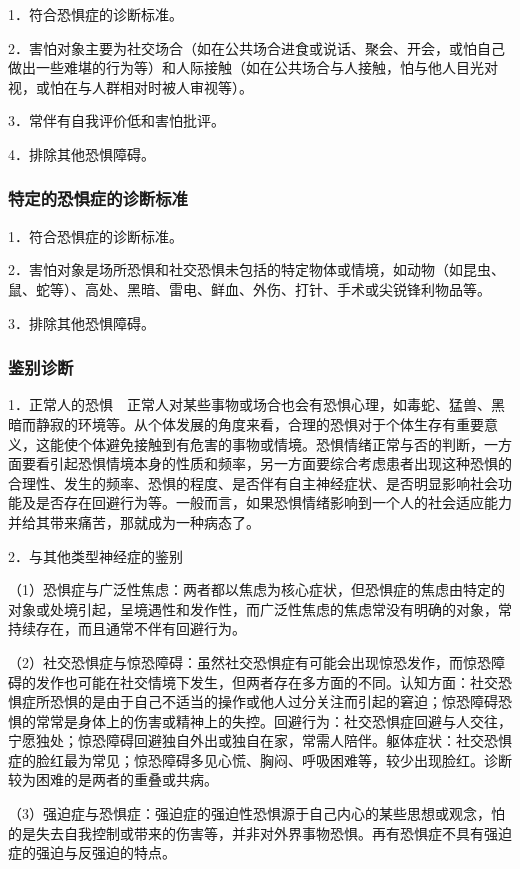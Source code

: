 1．符合恐惧症的诊断标准。

2．害怕对象主要为社交场合（如在公共场合进食或说话、聚会、开会，或怕自己做出一些难堪的行为等）和人际接触（如在公共场合与人接触，怕与他人目光对视，或怕在与人群相对时被人审视等）。

3．常伴有自我评价低和害怕批评。

4．排除其他恐惧障碍。

\subsubsection{特定的恐惧症的诊断标准}

1．符合恐惧症的诊断标准。

2．害怕对象是场所恐惧和社交恐惧未包括的特定物体或情境，如动物（如昆虫、鼠、蛇等）、高处、黑暗、雷电、鲜血、外伤、打针、手术或尖锐锋利物品等。

3．排除其他恐惧障碍。

\subsubsection{鉴别诊断}

1．正常人的恐惧　正常人对某些事物或场合也会有恐惧心理，如毒蛇、猛兽、黑暗而静寂的环境等。从个体发展的角度来看，合理的恐惧对于个体生存有重要意义，这能使个体避免接触到有危害的事物或情境。恐惧情绪正常与否的判断，一方面要看引起恐惧情境本身的性质和频率，另一方面要综合考虑患者出现这种恐惧的合理性、发生的频率、恐惧的程度、是否伴有自主神经症状、是否明显影响社会功能及是否存在回避行为等。一般而言，如果恐惧情绪影响到一个人的社会适应能力并给其带来痛苦，那就成为一种病态了。

2．与其他类型神经症的鉴别

（1）恐惧症与广泛性焦虑：两者都以焦虑为核心症状，但恐惧症的焦虑由特定的对象或处境引起，呈境遇性和发作性，而广泛性焦虑的焦虑常没有明确的对象，常持续存在，而且通常不伴有回避行为。

（2）社交恐惧症与惊恐障碍：虽然社交恐惧症有可能会出现惊恐发作，而惊恐障碍的发作也可能在社交情境下发生，但两者存在多方面的不同。认知方面：社交恐惧症所恐惧的是由于自己不适当的操作或他人过分关注而引起的窘迫；惊恐障碍恐惧的常常是身体上的伤害或精神上的失控。回避行为：社交恐惧症回避与人交往，宁愿独处；惊恐障碍回避独自外出或独自在家，常需人陪伴。躯体症状：社交恐惧症的脸红最为常见；惊恐障碍多见心慌、胸闷、呼吸困难等，较少出现脸红。诊断较为困难的是两者的重叠或共病。

（3）强迫症与恐惧症：强迫症的强迫性恐惧源于自己内心的某些思想或观念，怕的是失去自我控制或带来的伤害等，并非对外界事物恐惧。再有恐惧症不具有强迫症的强迫与反强迫的特点。


